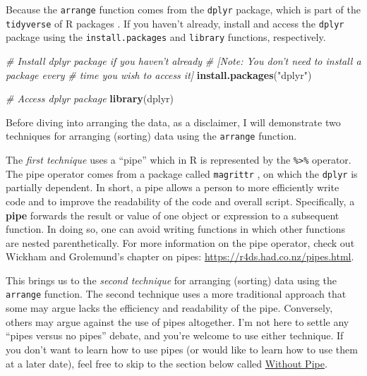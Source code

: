 \documentclass[]{book}
\newenvironment{Shaded}{\begin{snugshade}}{\end{snugshade}}
\newcommand{\KeywordTok}[1]{\textcolor[rgb]{0.13,0.29,0.53}{\textbf{#1}}}
\newcommand{\StringTok}[1]{\textcolor[rgb]{0.31,0.60,0.02}{#1}}
\newcommand{\CommentTok}[1]{\textcolor[rgb]{0.56,0.35,0.01}{\textit{#1}}}
\newcommand{\NormalTok}[1]{#1}
\begin{document}
Because the \texttt{arrange} function comes from the \texttt{dplyr}
package, which is part of the \texttt{tidyverse} of R packages
\citep{R-tidyverse, tidyverse2019}. If you haven't already, install and
access the \texttt{dplyr} package using the \texttt{install.packages}
and \texttt{library} functions, respectively.

\begin{Shaded}
\begin{Highlighting}[]
\CommentTok{# Install dplyr package if you haven't already}
\CommentTok{# [Note: You don't need to install a package every }
\CommentTok{# time you wish to access it]}
\KeywordTok{install.packages}\NormalTok{(}\StringTok{"dplyr"}\NormalTok{)}
\end{Highlighting}
\end{Shaded}

\begin{Shaded}
\begin{Highlighting}[]
\CommentTok{# Access dplyr package}
\KeywordTok{library}\NormalTok{(dplyr)}
\end{Highlighting}
\end{Shaded}

Before diving into arranging the data, as a disclaimer, I will
demonstrate two techniques for arranging (sorting) data using the
\texttt{arrange} function.

The \emph{first technique} uses a ``pipe'' which in R is represented by
the \texttt{\%\textgreater{}\%} operator. The pipe operator comes from a
package called \texttt{magrittr} \citep{R-magrittr}, on which the
\texttt{dplyr} is partially dependent. In short, a pipe allows a person
to more efficiently write code and to improve the readability of the
code and overall script. Specifically, a \textbf{pipe} forwards the
result or value of one object or expression to a subsequent function. In
doing so, one can avoid writing functions in which other functions are
nested parenthetically. For more information on the pipe operator, check
out Wickham and Grolemund's \citeyearpar{wickham2017} chapter on pipes:
\url{https://r4ds.had.co.nz/pipes.html}.

This brings us to the \emph{second technique} for arranging (sorting)
data using the \texttt{arrange} function. The second technique uses a
more traditional approach that some may argue lacks the efficiency and
readability of the pipe. Conversely, others may argue against the use of
pipes altogether. I'm not here to settle any ``pipes versus no pipes''
debate, and you're welcome to use either technique. If you don't want to
learn how to use pipes (or would like to learn how to use them at a
later date), feel free to skip to the section below called
\protect\hyperlink{opt1_arrange_withoutpipe}{Without Pipe}.
\end{document}
